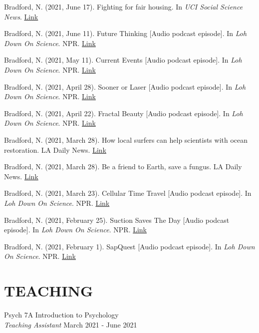 \documentclass[margin, 10pt]{res} %
\begin{document}
\begin{resume}
Bradford, N. (2021, June 17). Fighting for fair housing. In {\sl UCI Social Science News}. \href{https://www.socsci.uci.edu/newsevents/news/2021/2021-06-17-schmidt-haynes-foundation.php}{Link}

Bradford, N. (2021, June 11). Future Thinking [Audio podcast episode]. In {\sl Loh Down On Science}. NPR. \href{https://lohdownonscience.com/future-thinking/}{Link} 

Bradford, N. (2021, May 11). Current Events [Audio podcast episode]. In {\sl Loh Down On Science}. NPR. \href{https://lohdownonscience.com/current-events/}{Link}

Bradford, N. (2021, April 28). Sooner or Laser [Audio podcast episode]. In {\sl Loh Down On Science}. NPR. \href{https://lohdownonscience.com/sooner-or-laser/}{Link}

Bradford, N. (2021, April 22). Fractal Beauty [Audio podcast episode]. In {\sl Loh Down On Science}. NPR. \href{https://lohdownonscience.com/fractal-beauty/}{Link}

Bradford, N. (2021, March 28). How local surfers can help scientists with ocean restoration. LA Daily News. \href{https://www.dailynews.com/2021/03/28/how-local-surfers-can-help-scientists-with-ocean-restoration/}{Link}

Bradford, N. (2021, March 28). Be a friend to Earth, save a fungus. LA Daily News. \href{https://www.dailynews.com/2021/03/28/be-a-friend-to-earth-save-a-fungus/}{Link}

Bradford, N. (2021, March 23). Cellular Time Travel [Audio podcast episode]. In {\sl Loh Down On Science}. NPR.  \href{https://lohdownonscience.com/cellular-time-travel/}{Link}

Bradford, N. (2021, February 25). Suction Saves The Day [Audio podcast episode]. In {\sl Loh Down On Science}. NPR.  \href{https://lohdownonscience.com/suction-saves-the-day/}{Link}

Bradford, N. (2021, February 1). SapQuest [Audio podcast episode]. In {\sl Loh Down On Science}. NPR.  \href{https://lohdownonscience.com/sapquest/}{Link}





\section{TEACHING}
Psych 7A Introduction to Psychology \\ 
{\sl Teaching Assistant} \hfill {March 2021 - June 2021}


\end{resume}
\end{document}
